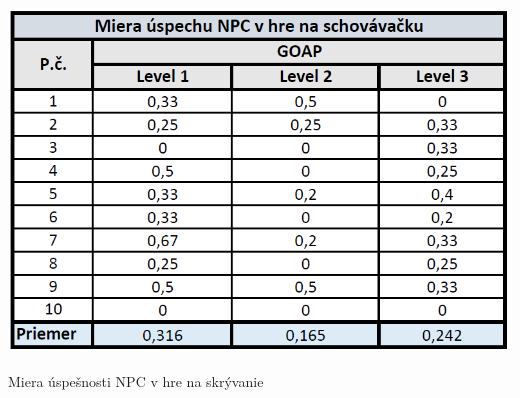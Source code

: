 \documentclass[10pt,twoside,slovak,a4paper]{article}
\begin{document}
\begin{table}[tbh]
\center \includegraphics[scale=0.5]{priklad.png}
\caption{Miera úspešnosti NPC v hre na skrývanie}
\label{t:t2}
\end{table}
\end{document}
